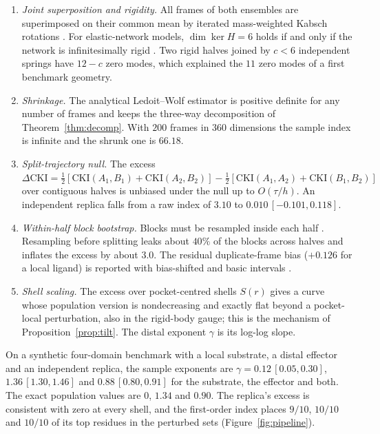 \documentclass[11pt,reqno]{amsart}
\theoremstyle{plain}
\theoremstyle{definition}
\theoremstyle{remark}
\numberwithin{equation}{section}
\newcommand{\CKI}{\mathrm{CKI}}
\newcommand{\DCKI}{\Delta\mathrm{CKI}}
\begin{document}
\begin{enumerate}[label=(\arabic*),leftmargin=*]
\item \emph{Joint superposition and rigidity.} All frames of both ensembles are superimposed on their common mean by iterated mass-weighted Kabsch rotations \cite{Kabsch1976}. For elastic-network models, $\dim\ker H=6$ holds if and only if the network is infinitesimally rigid \cite{AsimowRoth1978}. Two rigid halves joined by $c<6$ independent springs have $12-c$ zero modes, which explained the $11$ zero modes of a first benchmark geometry.
\item \emph{Shrinkage.} The analytical Ledoit--Wolf estimator \cite{LedoitWolf2004} is positive definite for any number of frames and keeps the three-way decomposition of Theorem~\ref{thm:decomp}. With $200$ frames in $360$ dimensions the sample index is infinite and the shrunk one is $66.18$.
\item \emph{Split-trajectory null.} The excess $\DCKI=\frac12[\CKI(A_1,B_1)+\CKI(A_2,B_2)]-\frac12[\CKI(A_1,A_2)+\CKI(B_1,B_2)]$ over contiguous halves is unbiased under the null up to $O(\tau/h)$. An independent replica falls from a raw index of $3.10$ to $0.010\,[-0.101,0.118]$.
\item \emph{Within-half block bootstrap.} Blocks must be resampled inside each half \cite{Kunsch1989}. Resampling before splitting leaks about $40\%$ of the blocks across halves and inflates the excess by about $3.0$. The residual duplicate-frame bias ($+0.126$ for a local ligand) is reported with bias-shifted and basic intervals \cite{EfronTibshirani1993}.
\item \emph{Shell scaling.} The excess over pocket-centred shells $S(r)$ gives a curve whose population version is nondecreasing and exactly flat beyond a pocket-local perturbation, also in the rigid-body gauge; this is the mechanism of Proposition~\ref{prop:tilt}. The distal exponent $\gamma$ is its log-log slope.
\end{enumerate}

On a synthetic four-domain benchmark with a local substrate, a distal effector and an independent replica, the sample exponents are $\gamma=0.12\,[0.05,0.30]$, $1.36\,[1.30,1.46]$ and $0.88\,[0.80,0.91]$ for the substrate, the effector and both. The exact population values are $0$, $1.34$ and $0.90$. The replica's excess is consistent with zero at every shell, and the first-order index places $9/10$, $10/10$ and $10/10$ of its top residues in the perturbed sets (Figure~\ref{fig:pipeline}).
\end{document}
